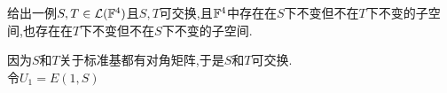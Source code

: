 \documentclass{ctexart}
\begin{document}
\pagestyle{empty}
\begin{center}
    \large{}
\end{center}
\begin{problem}[1.]
    给出一例$S,T\in\mathcal{L}(\mathbb{F}^4)$且$S,T$可交换,且$\mathbb{F}^4$中存在在$S$下不变但不在$T$下不变的子空间,也存在在$T$下不变但不在$S$下不变的子空间.
\end{problem}
\begin{solution}
    
    因为$S$和$T$关于标准基都有对角矩阵,于是$S$和$T$可交换.\\
    令$U_1=E(1,S)$
\end{solution}
\end{document}
